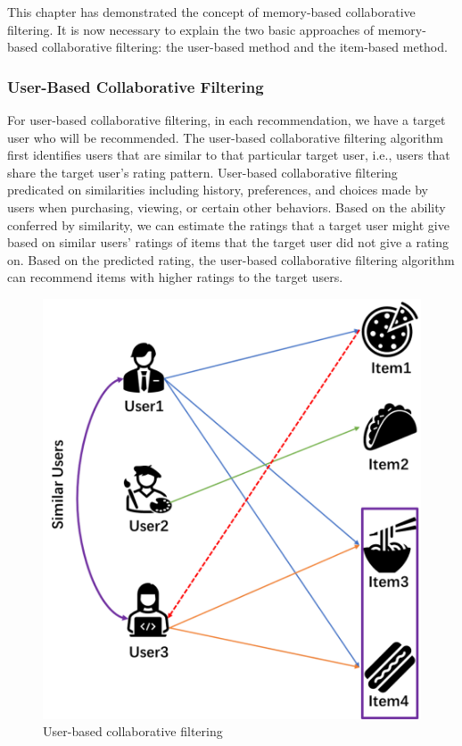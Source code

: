This chapter has demonstrated the concept of memory-based collaborative filtering. It is now necessary to explain the two basic approaches of memory-based collaborative filtering: the user-based method and the item-based method.
\subsubsection{User-Based Collaborative Filtering}
For user-based collaborative filtering, in each recommendation, we have a target user who will be recommended. The user-based collaborative filtering algorithm first identifies users that are similar to that particular target user, i.e., users that share the target user's rating pattern. User-based collaborative filtering predicated on similarities including history, preferences, and choices made by users when purchasing, viewing, or certain other behaviors. Based on the ability conferred by similarity, we can estimate the ratings that a target user might give based on similar users' ratings of items that the target user did not give a rating on. Based on the predicted rating, the user-based collaborative filtering algorithm can recommend items with higher ratings to the target users.
\begin{figure}
\centering
\includegraphics[scale=0.5]{figure/mo.png}
\caption{User-based collaborative filtering}
\end{figure}

